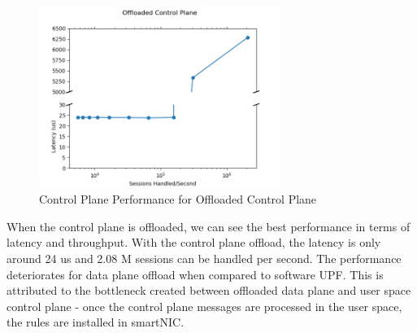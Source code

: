 \begin{figure}[htbp]
    \centering
    \includegraphics[width=0.7\textwidth, keepaspectratio]{./fig/Results/CPOffload.png}
    \caption{Control Plane Performance for Offloaded Control Plane}
    \label{fig:CPOffload}
\end{figure}

When the control plane is offloaded, we can see the best performance in terms of latency and throughput.
With the control plane offload, the latency is only around  24 us and 2.08 M sessions can 
be handled per second.
The performance deteriorates for data plane offload when compared to software UPF. This is 
attributed to the  bottleneck created between offloaded data plane
 and user space control plane - once the control plane messages are processed in
the user space, the rules are installed in smartNIC.
